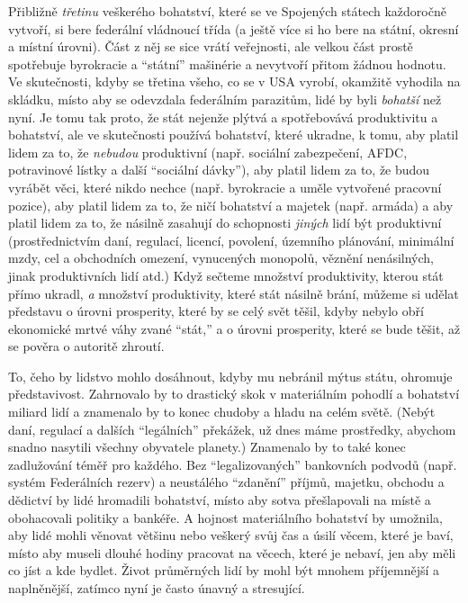 \documentclass{book}
\begin{document}
Přibližně \emph{třetinu} veškerého bohatství, které se ve Spojených státech každoročně vytvoří, si bere federální vládnoucí třída (a ještě více si ho bere na státní, okresní a místní úrovni). Část z něj se sice vrátí veřejnosti, ale velkou část prostě spotřebuje byrokracie a \enquote{státní} mašinérie a nevytvoří přitom žádnou hodnotu. Ve skutečnosti, kdyby se třetina všeho, co se v USA vyrobí, okamžitě vyhodila na skládku, místo aby se odevzdala federálním parazitům, lidé by byli \emph{bohatší} než nyní. Je tomu tak proto, že stát nejenže plýtvá a spotřebovává produktivitu a bohatství, ale ve skutečnosti používá bohatství, které ukradne, k tomu, aby platil lidem za to, že \emph{nebudou} produktivní (např. sociální zabezpečení, AFDC, potravinové lístky a další \enquote{sociální dávky}), aby platil lidem za to, že budou vyrábět věci, které nikdo nechce (např. byrokracie a uměle vytvořené pracovní pozice), aby platil lidem za to, že ničí bohatství a majetek (např. armáda) a aby platil lidem za to, že násilně zasahují do schopnosti \emph{jiných} lidí být produktivní (prostřednictvím daní, regulací, licencí, povolení, územního plánování, minimální mzdy, cel a obchodních omezení, vynucených monopolů, věznění nenásilných, jinak produktivních lidí atd.) Když sečteme množství produktivity, kterou stát přímo ukradl, \emph{a} množství produktivity, které stát násilně brání, můžeme si udělat představu o úrovni prosperity, které by se celý svět těšil, kdyby nebylo obří ekonomické mrtvé váhy zvané \enquote{stát,} a o úrovni prosperity, které se bude těšit, až se pověra o autoritě zhroutí.

To, čeho by lidstvo mohlo dosáhnout, kdyby mu nebránil mýtus státu, ohromuje představivost. Zahrnovalo by to drastický skok v materiálním pohodlí a bohatství miliard lidí a znamenalo by to konec chudoby a hladu na celém světě. (Nebýt daní, regulací a dalších \enquote{legálních} překážek, už dnes máme prostředky, abychom snadno nasytili všechny obyvatele planety.) Znamenalo by to také konec zadlužování téměř pro každého. Bez \enquote{legalizovaných} bankovních podvodů (např. systém Federálních rezerv) a neustálého \enquote{zdanění} příjmů, majetku, obchodu a dědictví by lidé hromadili bohatství, místo aby sotva přešlapovali na místě a obohacovali politiky a bankéře. A hojnost materiálního bohatství by umožnila, aby lidé mohli věnovat většinu nebo veškerý svůj čas a úsilí věcem, které je baví, místo aby museli dlouhé hodiny pracovat na věcech, které je nebaví, jen aby měli co jíst a kde bydlet. Život průměrných lidí by mohl být mnohem příjemnější a naplněnější, zatímco nyní je často únavný a stresující.
\end{document}
